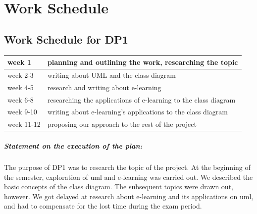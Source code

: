 \thispagestyle{empty}

\chapter{Work Schedule}

\renewcommand*{\thepage}{B-\arabic{page}}

\section{Work Schedule for DP1}
\begin{tabular}{|l||l|}
\hline
week 1     & planning and outlining the work, researching the topic  \\
\hline
week 2-3     & writing about UML and the class diagram \\
\hline
week 4-5     & research and writing about e-learning \\
\hline
week 6-8      & researching the applications of e-learning to the class diagram  \\
\hline
week 9-10   & writing about e-learning's applications to the class diagram  \\
\hline
week 11-12   & proposing our approach to the rest of the project \\
\hline
\end{tabular}

\paragraph{Statement on the execution of the plan:} 

The purpose of DP1 was to research the topic of the project. At the beginning of the semester, exploration of \ac{uml} and e-learning was carried out. We described the basic concepts of the class diagram. The subsequent topics were drawn out, however. We got delayed at research about e-learning and its applications on \ac{uml}, and had to compensate for the lost time during the exam period. 






